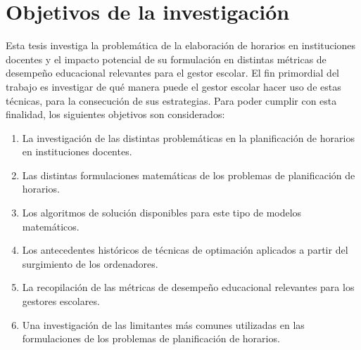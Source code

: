 \documentclass[draft,12pt,headsepline,footsepline,paper=letter]{scrreprt}
\begin{document}

\section{Objetivos de la investigación}

Esta tesis investiga la problemática de la elaboración de horarios en instituciones docentes y el impacto potencial de su formulación en distintas métricas de desempeño educacional relevantes para el gestor escolar. 
El fin primordial del trabajo es investigar de qué manera puede el gestor escolar hacer uso de estas técnicas, para la consecución de sus estrategias.
Para poder cumplir con esta finalidad, los siguientes objetivos son considerados:
\begin{enumerate}[1]
\item La investigación de las distintas problemáticas en la planificación de horarios en instituciones docentes.
\item Las distintas formulaciones matemáticas de los problemas de planificación de horarios.
\item Los algoritmos de solución disponibles para este tipo de modelos matemáticos.
\item Los antecedentes históricos de técnicas de optimación aplicados a partir del surgimiento de los ordenadores.
\item La recopilación de las métricas de desempeño educacional relevantes para los gestores escolares.
\item Una investigación de las limitantes más comunes utilizadas en las formulaciones de los problemas de planificación de horarios.
\end{enumerate}

\end{document}
